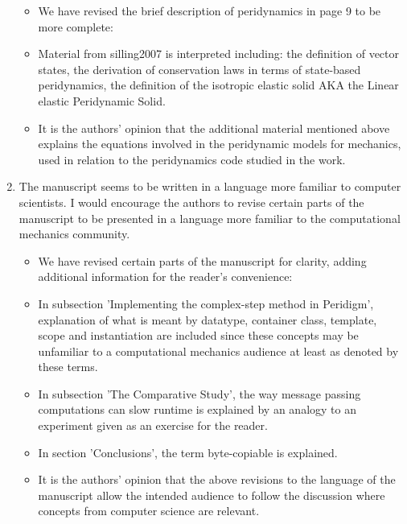 \documentclass{article}
\begin{document}
\begin{enumerate}
{\color{red}
  \begin{itemize}
    \item 
        We have revised the brief description of peridynamics in page 9 to be more complete:
    \item
        Material from silling2007 is interpreted including: the definition of vector states,
        the derivation of conservation laws in terms of state-based peridynamics, the definition
        of the isotropic elastic solid AKA the Linear elastic Peridynamic Solid.
    \item
        It is the authors' opinion that the additional material mentioned above explains the equations involved
        in the peridynamic models for mechanics, used in relation to the peridynamics code
        studied in the work. 

  \end{itemize}}
    \item 
        The manuscript seems to be written in a language more familiar to computer scientists. 
        I would encourage the authors to revise certain parts of the manuscript to be
        presented in a language more familiar to the computational mechanics community.

{\color{red}
  \begin{itemize}
    \item 
        We have revised certain parts of the manuscript for clarity, adding additional information for the reader's
        convenience:
    \item
        In subsection 'Implementing the complex-step method in Peridigm', explanation of what is meant by datatype,
        container class, template, scope and instantiation are included since these concepts may be unfamiliar to
        a computational mechanics audience at least as denoted by these terms. 
    \item 
        In subsection 'The Comparative Study', the way message passing computations can slow runtime is explained
        by an analogy to an experiment given as an exercise for the reader. 
    \item 
        In section 'Conclusions', the term byte-copiable is explained. 
    \item 
        It is the authors' opinion that the above revisions to the language of the manuscript allow the intended audience
        to follow the discussion where concepts from computer science are relevant.
  \end{itemize}}


\end{enumerate}
\end{document}

